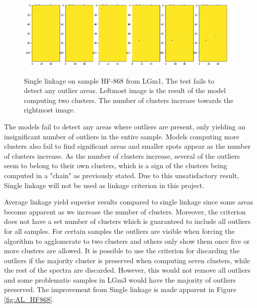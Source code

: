 \begin{figure}[H]

    \centering
{\includegraphics[width=15cm]{images/Single_linkage/LGm-1/HF-868_1_2.h5_0.png} }
\caption{Single linkage on sample HF-868 from LGm1, The test fails to detect any outlier areas. Leftmost image is the result of the model computing two clusters. The number of clusters increase towards the rightmost image.\label{fig:SL_HF868}}%

\end{figure}

The models fail to detect any areas where outliers are present, only yielding an insignificant number of outliers in the entire sample. Models computing more clusters also fail to find significant areas and smaller spots appear as the number of clusters increase. As the number of clusters increase, several of the outliers seem to belong to their own clusters, which is a sign of the clusters being computed in a "chain" as previously stated. Due to this unsatisfactory result, Single linkage will not be used as linkage criterion in this project.


Average linkage yield superior results compared to single linkage since some areas become apparent as we increase the number of clusters. Moreover, the criterion does not have a set number of clusters which is guaranteed to include all outliers for all samples. For certain samples the outliers are visible when forcing the algorithm to agglomerate to two clusters and others only show them once five or more clusters are allowed. It is possible to use the criterion for discarding the outliers if the majority cluster is preserved when computing seven clusters, while the rest of the spectra are discarded. However, this would not remove all outliers and some problematic samples in LGm3 would have the majority of outliers preserved. The improvement from Single linkage is made apparent in Figure \ref{fig:AL_HF868}.

